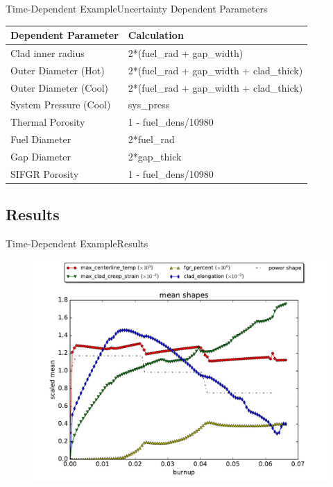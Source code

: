 \documentclass{beamer}
\begin{document}
\begin{frame}{Time-Dependent Example}{Uncertainty}\vspace{-20pt}
Dependent Parameters
\begin{table}[htb]
  \centering \footnotesize
  \begin{tabular}{l|l}\hline
Dependent Parameter & Calculation \\\hline
Clad inner radius  & 2*(fuel\_rad + gap\_width) \\
Outer Diameter (Hot)  & 2*(fuel\_rad + gap\_width + clad\_thick) \\
Outer Diameter (Cool) & 2*(fuel\_rad + gap\_width + clad\_thick) \\
System Pressure (Cool)   & sys\_press \\
Thermal Porosity  & 1 - fuel\_dens/10980 \\
Fuel Diameter    & 2*fuel\_rad \\
Gap Diameter     & 2*gap\_thick \\
SIFGR Porosity   & 1 - fuel\_dens/10980
  \end{tabular}
\end{table}
\end{frame}

\subsection{Results}
\begin{frame}{Time-Dependent Example}{Results}\vspace{-20pt}
      \begin{figure}
        \centering
        \includegraphics[width=0.8\linewidth]{oecd/meanplots}
      \end{figure}
\end{frame}
\end{document}
